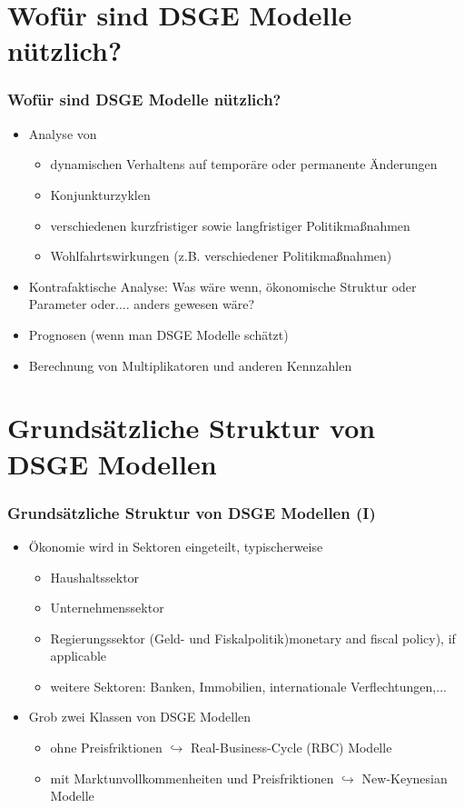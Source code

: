 \documentclass[10pt]{beamer}  %
\begin{document}
\section{Wof\"{u}r sind DSGE Modelle n\"{u}tzlich?}
\begin{frame}
\frametitle{Wof\"{u}r sind DSGE Modelle n\"{u}tzlich?}
\begin{itemize}
\item Analyse von
\begin{itemize}
\item dynamischen Verhaltens auf tempor\"{a}re oder permanente \"{A}nderungen
\item Konjunkturzyklen
\item verschiedenen kurzfristiger sowie langfristiger Politikma{\ss}nahmen
\item Wohlfahrtswirkungen (z.B. verschiedener Politikma{\ss}nahmen)
\end{itemize}
\item Kontrafaktische Analyse: Was w\"{a}re wenn, \"{o}konomische Struktur oder Parameter oder.... anders gewesen w\"{a}re?
\item Prognosen (wenn man DSGE Modelle sch\"{a}tzt)
\item Berechnung von Multiplikatoren und anderen Kennzahlen
\end{itemize}
\end{frame}

\section{Grunds\"{a}tzliche Struktur von DSGE Modellen}
\begin{frame}
\frametitle{Grunds\"{a}tzliche Struktur von DSGE Modellen (I)}
\begin{itemize}
\item \"{O}konomie wird in Sektoren eingeteilt, typischerweise
\begin{itemize}
\item Haushaltssektor
\item Unternehmenssektor
\item Regierungssektor (Geld- und Fiskalpolitik)monetary and fiscal policy), if applicable
\item weitere Sektoren: Banken, Immobilien, internationale Verflechtungen,...
\end{itemize}
\item Grob zwei Klassen von DSGE Modellen
\begin{itemize}
\item ohne Preisfriktionen $\hookrightarrow$ Real-Business-Cycle (RBC) Modelle
\item mit Marktunvollkommenheiten und Preisfriktionen $\hookrightarrow$ New-Keynesian Modelle
\end{itemize}
\end{itemize}
\end{frame}
\end{document}
